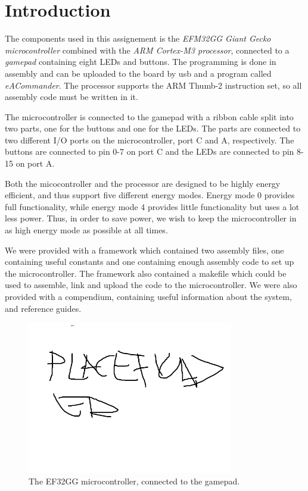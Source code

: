 \section{Introduction}

The components used in this assignement is the \textit{EFM32GG Giant Gecko microcontroller} combined with
the \textit{ARM Cortex-M3 processor}, connected to a \textit{gamepad} containing eight LEDs and buttons. The programming
is done in assembly and can be uploaded to the board by usb and a program called \textit{eACommander}. The processor supports the ARM Thumb-2 instruction set, so all assembly code must be written in it. 

The microcontroller is connected to the gamepad with a ribbon cable split into two parts, one for the buttons and one for the LEDs. The parts are connected to two different I/O ports on the microcontroller, port C and A, respectively. The buttons are connected to pin 0-7 on port C and the LEDs are connected to pin 8-15 on port A. 

Both the micocontroller and the processor are designed to be highly energy efficient, and thus support five different energy modes. Energy mode 0 provides full functionality, while energy mode 4 provides little functionality but uses a lot less power. Thus, in order to save power, we wish to keep the microcontroller in as high energy mode as possible at all times. 

We were provided with a framework which contained two assembly files, one containing useful constants and one containing enough assembly code to set up the microcontroller. The framework also contained a makefile which could be used to assemble, link and upload the code to the microcontroller. We were also provided with a compendium\cite{compendium}, containing useful information about the 
system, and reference guides\cite{cortex}\cite{efm32gg}.

\begin{figure}[ht]
    \centering
      \includegraphics[width=9cm]{figures/placeholder}
    \caption{The EF32GG microcontroller, connected to the gamepad.}
    \label{figure_ef32gg}
\end{figure}

